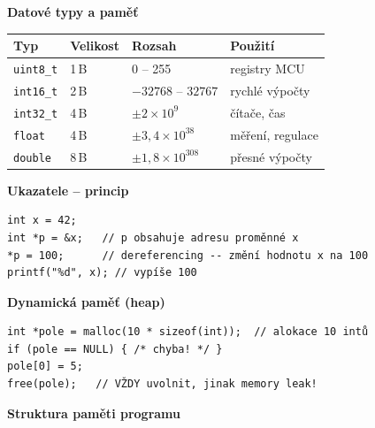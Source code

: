 \documentclass[a4paper,10pt]{article}
\begin{document}
\begin{vysvetlenibox}
\textbf{Datové typy a paměť}

\begin{center}
\begin{tabular}{@{} l l l l @{}}
    \toprule
    \textbf{Typ} & \textbf{Velikost} & \textbf{Rozsah} & \textbf{Použití} \\
    \midrule
    \texttt{uint8\_t}  & 1\,B & 0 -- 255              & registry MCU \\
    \texttt{int16\_t}  & 2\,B & $-32768$ -- $32767$   & rychlé výpočty \\
    \texttt{int32\_t}  & 4\,B & $\pm 2 \times 10^9$   & čítače, čas \\
    \texttt{float}     & 4\,B & $\pm 3{,}4\times10^{38}$ & měření, regulace \\
    \texttt{double}    & 8\,B & $\pm 1{,}8\times10^{308}$ & přesné výpočty \\
    \bottomrule
\end{tabular}
\end{center}

\textbf{Ukazatele -- princip}

\begin{vzorcebox}
\begin{verbatim}
int x = 42;
int *p = &x;   // p obsahuje adresu proměnné x
*p = 100;      // dereferencing -- změní hodnotu x na 100
printf("%d", x); // vypíše 100
\end{verbatim}
\end{vzorcebox}

\textbf{Dynamická paměť (heap)}

\begin{vzorcebox}
\begin{verbatim}
int *pole = malloc(10 * sizeof(int));  // alokace 10 intů
if (pole == NULL) { /* chyba! */ }
pole[0] = 5;
free(pole);   // VŽDY uvolnit, jinak memory leak!
\end{verbatim}
\end{vzorcebox}

\textbf{Struktura paměti programu}

\begin{center}
\end{center}


\end{vysvetlenibox}
\end{document}
